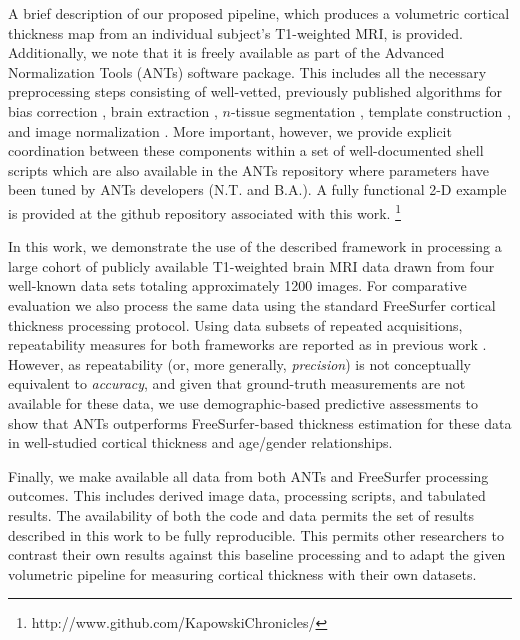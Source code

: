 A brief description of our proposed pipeline, which produces a volumetric
cortical thickness map from an individual subject's T1-weighted MRI, is provided.  
Additionally, we note that it is freely available as part of the Advanced Normalization Tools
(ANTs) software package.  This includes all the necessary preprocessing steps consisting
of well-vetted, previously published algorithms for bias correction \citep{tustison2010},
brain extraction \citep{avants2010a}, $n$-tissue segmentation \citep{avants2011a},
template construction \citep{avants2010}, and image normalization \citep{avants2011}.
More important, however, we provide explicit coordination between
these components within a set of well-documented shell scripts which 
are also available in the ANTs repository where parameters have been tuned
by ANTs developers (N.T. and B.A.).  A fully functional 2-D example is provided
at the github repository associated with this work.%
\footnote{
http://www.github.com/KapowskiChronicles/
}

In this work, we demonstrate the use of the described framework 
in processing a large 
cohort of publicly available T1-weighted brain MRI data drawn from 
four well-known data sets totaling approximately 1200 images.  For
comparative evaluation we also process the same data using the 
standard FreeSurfer cortical thickness processing protocol.  Using 
data subsets of repeated acquisitions, repeatability measures
for both frameworks are reported as in previous work 
\citep{clarkson2011,jovicich2013}.  However, as repeatability (or, more generally, {\it precision})
is not conceptually equivalent to {\it accuracy}, and given that ground-truth
measurements are not available for these data, we use demographic-based
predictive assessments to show that ANTs outperforms FreeSurfer-based
thickness estimation for these data in well-studied cortical thickness 
and age/gender relationships.

Finally, we make available all data from both ANTs and FreeSurfer 
processing outcomes.  This includes derived image data, processing scripts, 
and tabulated results.  The availability of both the code and data permits
the set of results described in this work to be fully reproducible.  This
permits other researchers to contrast their own results against
this baseline processing and to adapt the given volumetric pipeline for measuring
cortical thickness with their own datasets.  



